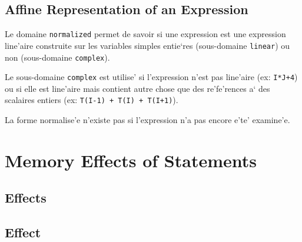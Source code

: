 \subsection{Affine Representation of an Expression}
\label{subsection-normalized}

{ Le domaine {\tt normalized} permet de savoir si une expression est une
expression line'aire construite sur les variables simples entie`res
(sous-domaine {\tt linear}) ou non (sous-domaine {\tt complex}).

Le sous-domaine {\tt complex} est utilise' si l'expression n'est pas
line'aire (ex: {\tt I*J+4}) ou si elle est line'aire mais contient autre
chose que des re'fe'rences a` des scalaires entiers (ex: {\tt T(I-1) +
T(I) + T(I+1)}).

La forme normalise'e n'existe pas si l'expression n'a pas encore e'te'
examine'e. }

\section{Memory Effects of Statements}
\label{effects}

\subsection{Effects}
\label{subsection-effects}

{}

\subsection{Effect}
\label{subsection-effect}

